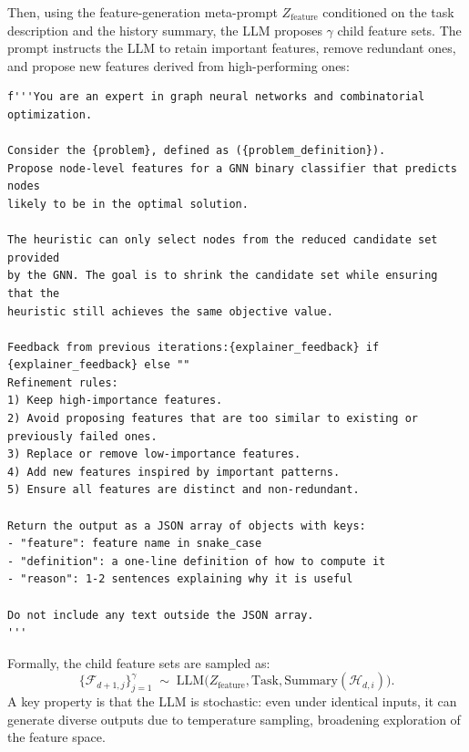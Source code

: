 Then, using the feature-generation meta-prompt $Z_{\text{feature}}$ conditioned on the
task description and the history summary, the LLM proposes $\gamma$ child feature sets.
The prompt instructs the LLM to retain important features, remove redundant ones, and
propose new features derived from high-performing ones:
\begin{verbatim}
f'''You are an expert in graph neural networks and combinatorial optimization.

Consider the {problem}, defined as ({problem_definition}).
Propose node-level features for a GNN binary classifier that predicts nodes
likely to be in the optimal solution.

The heuristic can only select nodes from the reduced candidate set provided
by the GNN. The goal is to shrink the candidate set while ensuring that the
heuristic still achieves the same objective value.

Feedback from previous iterations:{explainer_feedback} if {explainer_feedback} else ""
Refinement rules:
1) Keep high-importance features.
2) Avoid proposing features that are too similar to existing or previously failed ones.
3) Replace or remove low-importance features.
4) Add new features inspired by important patterns.
5) Ensure all features are distinct and non-redundant.

Return the output as a JSON array of objects with keys:
- "feature": feature name in snake_case
- "definition": a one-line definition of how to compute it
- "reason": 1-2 sentences explaining why it is useful

Do not include any text outside the JSON array.
'''
\end{verbatim}
Formally, the child feature sets are sampled as:
\[
\big\{\mathcal{F}_{d+1,j}\big\}_{j=1}^{\gamma} \;\sim\;
\text{LLM}\big(Z_{\text{feature}}, \text{Task}, \text{Summary}(\mathcal{H}_{d,i})\big).
\]
A key property is that the LLM is stochastic: even under identical inputs, it can generate
diverse outputs due to temperature sampling, broadening exploration of the feature space.

